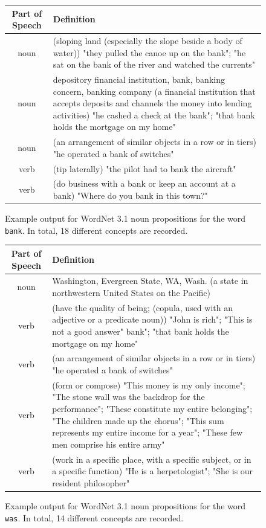 \documentclass[a4paper,12pt,oneside,openright]{report}
\begin{document}
\begin{figure}
\begin{center}
\begin{tabular}{ | c | p{11cm} | } 
 \hline
 Part of Speech & Definition \\  
 \hline
noun     & (sloping land (especially the slope beside a body of water)) "they pulled the canoe up on the bank"; "he sat on the bank of the river and watched the currents"\\ 
noun     & depository financial institution, bank, banking concern, banking company (a financial institution that accepts deposits and channels the money into lending activities) "he cashed a check at the bank"; "that bank holds the mortgage on my home" \\ 
 noun     & (an arrangement of similar objects in a row or in tiers) "he operated a bank of switches"  \\ 
verb & (tip laterally) "the pilot had to bank the aircraft" \\ 
verb    & (do business with a bank or keep an account at a bank) "Where do you bank in this town?"  \\ 
 \hline
\end{tabular}
\end{center}
\caption{Example output for WordNet 3.1 noun propositions for the word \texttt{bank}. In total, 18 different concepts are recorded.}
\label{fig:bank_synset}
\end{figure}

\begin{figure}
\begin{center}
\begin{tabular}{ | c | p{11cm} | } 
 \hline
 Part of Speech & Definition \\ 
 \hline
noun     & Washington, Evergreen State, WA, Wash. (a state in northwestern United States on the Pacific) \\ 
verb     & (have the quality of being; (copula, used with an adjective or a predicate noun)) "John is rich"; "This is not a good answer"
 bank"; "that bank holds the mortgage on my home" \\ 
 verb     & (an arrangement of similar objects in a row or in tiers) "he operated a bank of switches"  \\ 
verb & (form or compose) "This money is my only income"; "The stone wall was the backdrop for the performance"; "These constitute my entire belonging"; "The children made up the chorus"; "This sum represents my entire income for a year"; "These few men comprise his entire army" \\ 
verb    & (work in a specific place, with a specific subject, or in a specific function) "He is a herpetologist"; "She is our resident philosopher"  \\ 
 \hline
\end{tabular}
\end{center}
\caption{Example output for WordNet 3.1 noun propositions for the word \texttt{was}. In total, 14 different concepts are recorded.}
\label{fig:was_synset}
\end{figure}
\end{document}
